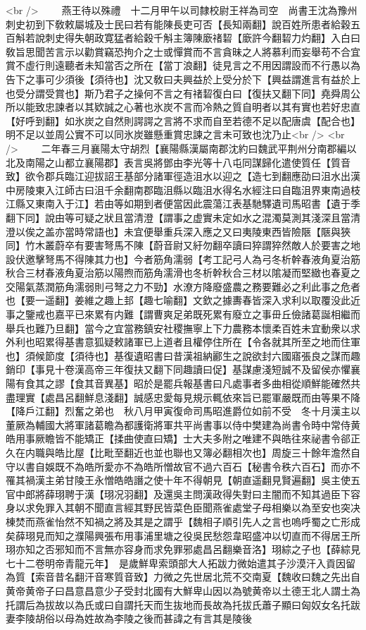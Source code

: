 <br />
　　燕王待以殊禮　十二月甲午以司隸校尉王祥為司空　尚書王沈為豫州刺史初到下敎敕屬城及士民曰若有能陳長吏可否【長知兩翻】說百姓所患者給穀五百斛若說刺史得失朝政寛猛者給穀千斛主簿陳廞禇䂮【廞許今翻䂮力灼翻】入白曰敎旨思聞苦言示以勸賞竊恐拘介之士或憚賞而不言貪昧之人將慕利而妄舉苟不合宜賞不虛行則遠聽者未知當否之所在【當丁浪翻】徒見言之不用因謂設而不行愚以為告下之事可少須後【須待也】沈又敎曰夫興益於上受分於下【興益謂進言有益於上也受分謂受賞也】斯乃君子之操何不言之有禇䂮復白曰【復扶又翻下同】堯舜周公所以能致忠諫者以其欵誠之心著也氷炭不言而冷熱之質自明者以其有實也若好忠直【好呼到翻】如氷炭之自然則諤諤之言將不求而自至若德不足以配唐虞【配合也】明不足以並周公實不可以同氷炭雖懸重賞忠諫之言未可致也沈乃止<br />
<br />
　　二年春三月襄陽太守胡烈【襄陽縣漢屬南郡沈約曰魏武平荆州分南郡編以北及南陽之山都立襄陽郡】表言吳將鄧由李光等十八屯同謀歸化遣使質任【質音致】欲令郡兵臨江迎拔詔王基部分諸軍徑造沮水以迎之【造七到翻應劭曰沮水出漢中房陵東入江師古曰沮千余翻南郡臨沮縣以臨沮水得名水經注曰自臨沮界東南過枝江縣又東南入于江】若由等如期到者便當因此震蕩江表基馳驛遺司馬昭書【遺于季翻下同】說由等可疑之狀且當清澄【謂事之虚實未定如水之混濁莫測其淺深且當清澄以俟之盖亦當時常語也】未宜便舉重兵深入應之又曰夷陵東西皆險陿【陿與狹同】竹木叢蔚卒有要害弩馬不陳【蔚音尉又紆勿翻卒讀曰猝謂猝然敵人於要害之地設伏邀擊弩馬不得陳其力也】今者筋角濡弱【考工記弓人為弓冬析幹春液角夏治筋秋合三材春液角夏治筋以陽煦而筋角濡滑也冬析幹秋合三材以隂凝而堅緻也春夏之交陽氣蒸潤筋角濡弱則弓弩之力不勁】水潦方降廢盛農之務要難必之利此事之危者也【要一遥翻】姜維之趣上邽【趣七喻翻】文欽之據夀春皆深入求利以取覆没此近事之鑒戒也嘉平已來累有内難【謂曹爽足弟既死累有廢立之事毌丘儉諸葛誕相繼而舉兵也難乃旦翻】當今之宜當務鎮安社稷撫寧上下力農務本懷柔百姓未宜動衆以求外利也昭累得基書意狐疑敕諸軍已上道者且權停住所在【令各就其所至之地而住軍也】須候節度【須待也】基復遺昭書曰昔漢祖納酈生之說欲封六國寤張良之謀而趣銷印【事見十卷漢高帝三年復扶又翻下同趣讀曰促】基謀慮淺短誠不及留侯亦懼襄陽有食其之謬【食其音異基】昭於是罷兵報基書曰凡處事者多曲相從順鮮能確然共盡理實【處昌呂翻鮮息淺翻】誠感忠愛每見規示輒依來旨已罷軍嚴既而由等果不降【降戶江翻】烈奮之弟也　秋八月甲寅復命司馬昭進爵位如前不受　冬十月漢主以董厥為輔國大將軍諸葛瞻為都護衛將軍共平尚書事以侍中樊建為尚書令時中常侍黄皓用事厥瞻皆不能矯正【揉曲使直曰矯】士大夫多附之唯建不與皓往來祕書令郤正久在内職與皓比屋【比毗至翻近也並也聯也又簿必翻相次也】周旋三十餘年澹然自守以書自娛既不為皓所愛亦不為皓所憎故官不過六百石【秘書令秩六百石】而亦不罹其禍漢主弟甘陵王永憎皓皓譖之使十年不得朝見【朝直遥翻見賢遍翻】吳主使五官中郎將薛珝聘于漢【珝况羽翻】及還吳主問漢政得失對曰主闇而不知其過臣下容身以求免罪入其朝不聞直言經其野民皆菜色臣聞燕雀處堂子母相樂以為至安也突决棟焚而燕雀怡然不知禍之將及其是之謂乎【魏相子順引先人之言也嗚呼蜀之亡形成矣薛珝見而知之濮陽興張布用事浦里塘之役吳民愁怨韋昭盛冲以切直而不得居王所珝亦知之否邪知而不言無亦容身而求免罪邪處昌呂翻樂音洛】珝綜之子也【薛綜見七十二卷明帝青龍元年】　是歲鮮卑索頭部大人拓跋力微始遣其子沙漠汗入貢因留為質【索音昔名翻汗音寒質音致】力微之先世居北荒不交南夏【魏收曰魏之先出自黄帝黄帝子曰昌意昌意少子受封北國有大鮮卑山因以為號黄帝以土德王北人謂土為托謂后為拔故以為氏或曰自謂托天而生抜地而長故為托拔氏蕭子顯曰匈奴女名托跋妻李陵胡俗以母為姓故為李陵之後而甚諱之有言其是陵後